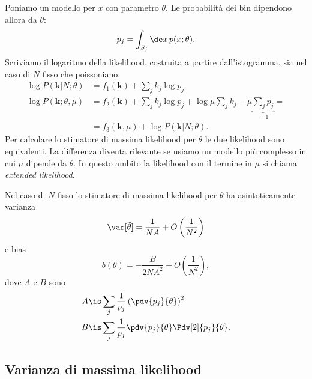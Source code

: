 Poniamo un modello per $x$ con parametro $\theta$.
Le probabilità dei bin dipendono allora da $\theta$:
\begin{equation*}
	p_j = \int_{S_j} \de x\, p(x;\theta).
\end{equation*}
Scriviamo il logaritmo della likelihood,
costruita a partire dall'istogramma,
sia nel caso di $N$ fisso che poissoniano.
\begin{align*}
	\log P(\mathbf k|N;\theta)
	&= f_1(\mathbf k) + \sum_j k_j\log p_j \\
	\log P(\mathbf k;\theta,\mu)
	&= f_2(\mathbf k) + \sum_j k_j\log p_j
	+ \log\mu\sum_jk_j - \mu\underbrace{\sum_jp_j}\limits_{=1} = \\
	&= f_3(\mathbf k,\mu) + \log P(\mathbf k|N;\theta).
\end{align*}
Per calcolare lo stimatore di massima likelihood per $\theta$ le due likelihood sono equivalenti.
La differenza diventa rilevante se usiamo un modello più complesso in cui $\mu$ dipende da $\theta$.
In questo ambito la likelihood con il termine in $\mu$ si chiama \emph{extended likelihood}.

\begin{fact}
	Nel caso di $N$ fisso lo stimatore di massima likelihood per $\theta$ ha asintoticamente varianza
	\begin{equation*}
		\var[\hat\theta]
		= \frac1{NA} + O\left(\frac1{N^2}\right)
	\end{equation*}
	e bias
	\begin{equation*}
		b(\theta)
		= -\frac B{2NA^2} + O\left(\frac1{N^2}\right),
	\end{equation*}
	dove $A$ e $B$ sono
	\begin{align*}
		A
		&\is \sum_j \frac1{p_j} \left(\pdv{p_j}{\theta}\right)^2 \\
		B
		&\is \sum_j \frac1{p_j} \pdv{p_j}{\theta} \Pdv[2]{p_j}{\theta}.
	\end{align*}
\end{fact}

\subsection{Varianza di massima likelihood}


